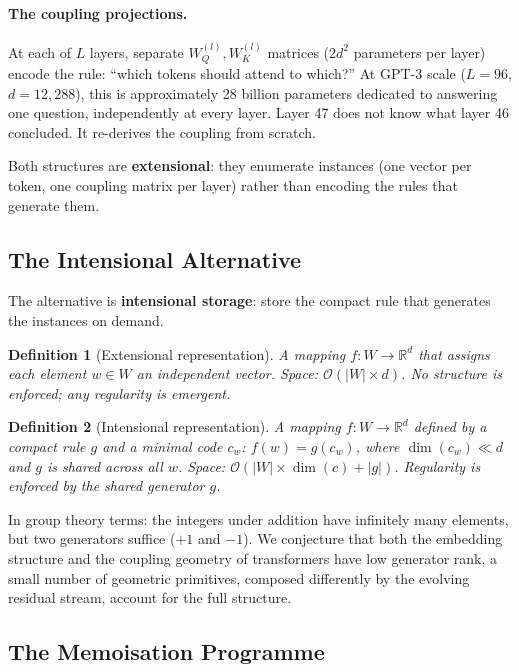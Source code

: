 \documentclass[11pt, a4paper]{article}
\newcommand{\R}{\mathbb{R}}
\newcommand{\bigO}{\mathcal{O}}
\newtheorem{definition}{Definition}
\theoremstyle{remark}
\begin{document}
\paragraph{The coupling projections.}
At each of $L$ layers, separate $W_Q^{(l)}, W_K^{(l)}$ matrices ($2d^2$ parameters per layer) encode the rule: ``which tokens should attend to which?''
At GPT-3 scale ($L{=}96$, $d{=}12{,}288$), this is approximately 28 billion parameters dedicated to answering one question, independently at every layer.
Layer 47 does not know what layer 46 concluded.
It re-derives the coupling from scratch.

Both structures are \textbf{extensional}: they enumerate instances (one vector per token, one coupling matrix per layer) rather than encoding the rules that generate them.


\subsection{The Intensional Alternative}

The alternative is \textbf{intensional storage}: store the compact rule that generates the instances on demand.

\begin{definition}[Extensional representation]
A mapping $f: W \to \R^d$ that assigns each element $w \in W$ an independent vector.
Space: $\bigO(|W| \times d)$.
No structure is enforced; any regularity is emergent.
\end{definition}

\begin{definition}[Intensional representation]
A mapping $f: W \to \R^d$ defined by a compact rule $g$ and a minimal code $c_w$:
$f(w) = g(c_w)$, where $\dim(c_w) \ll d$ and $g$ is shared across all $w$.
Space: $\bigO(|W| \times \dim(c) + |g|)$.
Regularity is enforced by the shared generator $g$.
\end{definition}

In group theory terms: the integers under addition have infinitely many elements, but two generators suffice ($+1$ and $-1$).
We conjecture that both the embedding structure and the coupling geometry of transformers have low generator rank, a small number of geometric primitives, composed differently by the evolving residual stream, account for the full structure.

\subsection{The Memoisation Programme}
\end{document}
